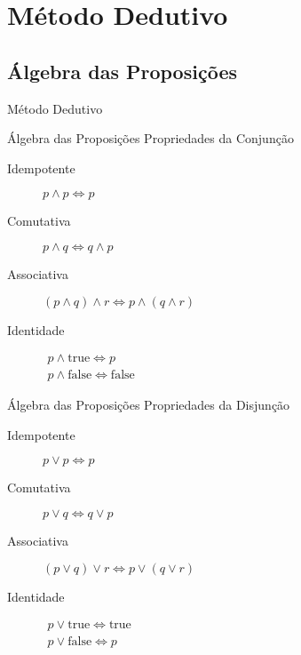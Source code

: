 
\section{Método Dedutivo}

\subsection{Álgebra das Proposições}

\begin{frame}[t]
\vskip 3.5cm
\begin{center}
{\Huge Método Dedutivo}
\end{center}
\end{frame}

\begin{frame}[t]{Álgebra das Proposições}
	Propriedades da Conjunção

	\vskip 0.7cm

	\begin{description}
	\item [Idempotente] $p \wedge p \Leftrightarrow p$
	\item [Comutativa] $p \wedge q \Leftrightarrow q \wedge p$
	\item [Associativa] $(p \wedge q) \wedge r \Leftrightarrow p \wedge (q \wedge r)$
	\item [Identidade] $\begin{array}{l}p \wedge \mbox{true} \Leftrightarrow p\\p \wedge \mbox{false} \Leftrightarrow \mbox{false}\end{array}$
	\end{description}
\end{frame}

\begin{frame}[t]{Álgebra das Proposições}
	Propriedades da Disjunção

	\vskip 0.7cm

	\begin{description}
	\item [Idempotente] $p \vee p \Leftrightarrow p$
	\item [Comutativa] $p \vee q \Leftrightarrow q \vee p$
	\item [Associativa] $(p \vee q) \vee r \Leftrightarrow p \vee (q \vee r)$
	\item [Identidade] $\begin{array}{l}p \vee \mbox{true} \Leftrightarrow \mbox{true}\\p \vee \mbox{false} \Leftrightarrow p\end{array}$
	\end{description}
\end{frame}


